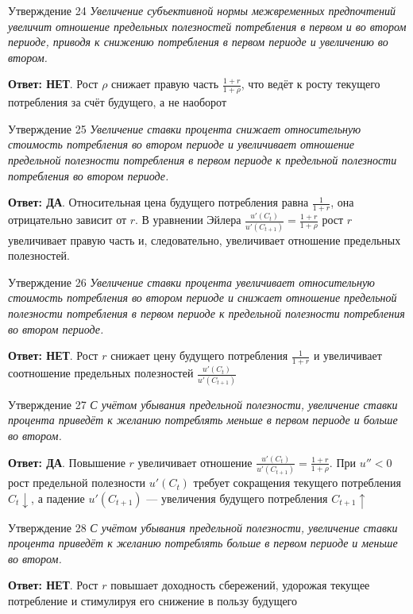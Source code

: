 \documentclass[10pt,a4paper]{article}
\newcommand{\qda}{\textbf{\color{yesgreen}Ответ: ДА}}
\newcommand{\qnet}{\textbf{\color{nored}Ответ: НЕТ}}
\newenvironment{answer}[2]{%
  \begin{qbox}{Утверждение #1}
  \textit{#2}\par\smallskip
}{%
  \end{qbox}\vspace{2pt}
}
\begin{document}
\begin{answer}{24}{Увеличение субъективной нормы межвременных предпочтений увеличит отношение предельных полезностей потребления в первом и во втором периоде, приводя к снижению потребления в первом периоде и увеличению во втором.}
\qnet. Рост $\rho$ снижает правую часть $\frac{1+r}{1+\rho}$, что ведёт к росту текущего потребления за счёт будущего, а не наоборот
\end{answer}

\begin{answer}{25}{Увеличение ставки процента снижает относительную стоимость потребления во втором периоде и увеличивает отношение предельной полезности потребления в первом периоде к предельной полезности потребления во втором периоде.}
\qda. Относительная цена будущего потребления равна $\frac{1}{1+r}$, она отрицательно зависит от $r$. В уравнении Эйлера $\frac{u'(C_t)}{u'(C_{t+1})} = \frac{1+r}{1+\rho}$ рост $r$ увеличивает правую часть и, следовательно, увеличивает отношение предельных полезностей.
\end{answer}

\begin{answer}{26}{Увеличение ставки процента увеличивает относительную стоимость потребления во втором периоде и снижает отношение предельной полезности потребления в первом периоде к предельной полезности потребления во втором периоде.}
\qnet. Рост $r$ снижает цену будущего потребления $\frac{1}{1+r}$ и увеличивает соотношение предельных полезностей $\frac{u'(C_t)}{u'(C_{t+1})}$
\end{answer}

\begin{answer}{27}{С учётом убывания предельной полезности, увеличение ставки процента приведёт к желанию потреблять меньше в первом периоде и больше во втором.}
\qda. Повышение $r$ увеличивает отношение $\frac{u'(C_t)}{u'(C_{t+1})} = \frac{1+r}{1+\rho}$. При $u'' < 0$ рост предельной полезности $u'(C_t)$ требует сокращения текущего потребления $C_t \downarrow$, а падение $u'(C_{t+1})$ — увеличения будущего потребления $C_{t+1} \uparrow$
\end{answer}

\begin{answer}{28}{С учётом убывания предельной полезности, увеличение ставки процента приведёт к желанию потреблять больше в первом периоде и меньше во втором.}
\qnet. Рост $r$ повышает доходность сбережений, удорожая текущее потребление и стимулируя его снижение в пользу будущего
\end{answer}
\end{document}

